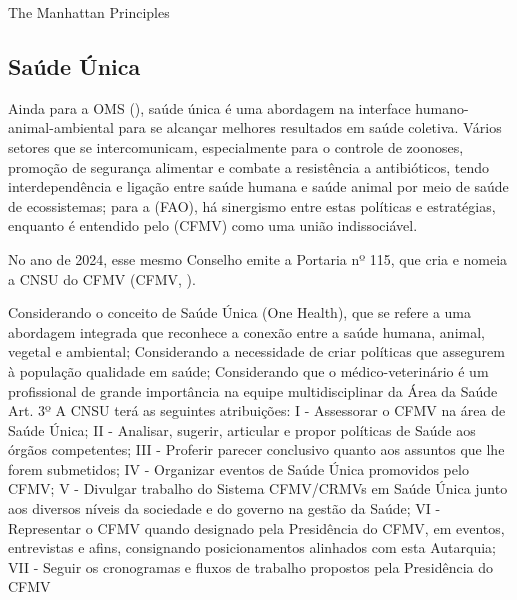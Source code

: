 \indent The Manhattan Principles

\subsection{Saúde Única}


\indent Ainda para a \acrshort{OMS} (\citeyear{OMS2022S1}), saúde única é uma abordagem na interface humano-animal-ambiental para se alcançar melhores resultados em saúde coletiva. Vários setores que se intercomunicam, especialmente para o controle de zoonoses, promoção de segurança alimentar e combate a resistência a antibióticos, tendo interdependência e ligação entre saúde humana e saúde animal por meio de saúde de ecossistemas; para a  (\acrshort{FAO}), há sinergismo entre estas políticas e estratégias, enquanto é entendido pelo  (\acrshort{CFMV}) como uma união indissociável.

\indent No ano de 2024, esse mesmo Conselho emite a Portaria nº 115, que cria e nomeia a \acrfull{CNSU} do \acrshort{CFMV} (\acrlong{CFMV}, \citeyear{CFMV2024PORTARIA}).

\indent Considerando o conceito de Saúde Única (One Health), que se refere a uma abordagem
integrada que reconhece a conexão entre a saúde humana, animal, vegetal e ambiental;
Considerando a necessidade de criar políticas que assegurem à população qualidade em saúde;
Considerando que o médico-veterinário é um profissional de grande importância na equipe
multidisciplinar da Área da Saúde
Art. 3º A CNSU terá as seguintes atribuições:
I - Assessorar o CFMV na área de Saúde Única;
II - Analisar, sugerir, articular e propor políticas de Saúde aos órgãos competentes;
III - Proferir parecer conclusivo quanto aos assuntos que lhe forem submetidos;
IV - Organizar eventos de Saúde Única promovidos pelo CFMV;
V - Divulgar trabalho do Sistema CFMV/CRMVs em Saúde Única junto aos diversos níveis da sociedade
e do governo na gestão da Saúde;
VI - Representar o CFMV quando designado pela Presidência do CFMV, em eventos, entrevistas e afins,
consignando posicionamentos alinhados com esta Autarquia;
VII - Seguir os cronogramas e fluxos de trabalho propostos pela Presidência do CFMV

